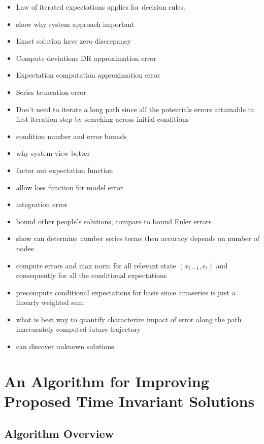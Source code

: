 \documentclass[12pt]{article}
\begin{document}
  \begin{itemize}
  \item Law of iterated expectations applies for decision rules.
  \item show why system approach important
  \item Exact solution have zero discrepancy
  \item Compute deviations  DR approximation error
  \item Expectation computation approximation error
  \item Series truncation error
  \item Don't need to iterate a long path since all the potentials 
errors attainable in first iteration step by searching across initial conditions
\item condition number and error bounds
  \item why system view better
  \item factor out expectation function
  \item allow loss function for model error
  \item integration error 
  \item bound other people's solutions, compare to bound Euler errors
  \item show can determine number series terms then accuracy depends on number of nodes
  \item compute errors and max norm for all relevant state $(x_{t-1},\epsilon_t)$ and consequently for all the conditional expectations
  \item precompute  conditional expectations for basis since amaseries is
just a linearly weighted sum
\item what is best way to quantify characterize impact of error along the path
inaccurately computed future trajectory
\item can discover unknown solutions
\end{itemize}






\section{An Algorithm for Improving Proposed Time Invariant Solutions}
\label{sec:algoforsoln}

\subsection{Algorithm Overview}
\label{sec:algoverview}
\end{document}
